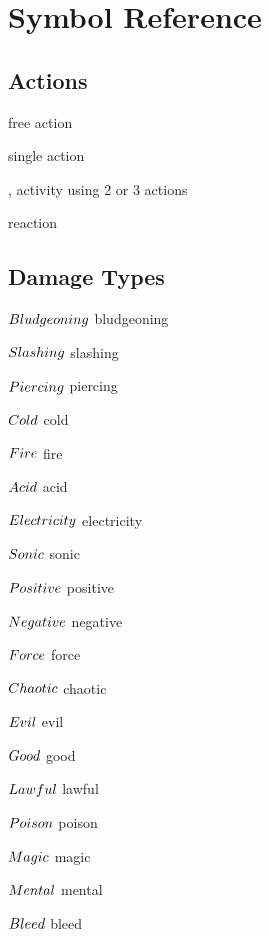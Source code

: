 \documentclass[paper=63mm:88mm, DIV=21, fontsize=7.5pt]{scrartcl}
\begin{document}
\newcommand{\Traits}[1]{\colorbox{tagsBg}{#1}}

\section{Symbol Reference}

\subsection{Actions\hfill{}}

 free action

 single action 

,  activity using 2 or 3 actions

 reaction

\subsection{Damage Types\hfill{}}

\begin{multicols}{3}
\footnotesize

\(\DamageType{Bludgeoning}\) bludgeoning

\(\DamageType{Slashing}\) slashing

\(\DamageType{Piercing}\) piercing

\(\DamageType{Cold}\) cold

\(\DamageType{Fire}\) fire

\(\DamageType{Acid}\) acid

\(\DamageType{Electricity}\) electricity

\(\DamageType{Sonic}\) sonic

\(\DamageType{Positive}\) positive

\(\DamageType{Negative}\) negative

\(\DamageType{Force}\) force

\(\DamageType{Chaotic}\) chaotic

\(\DamageType{Evil}\) evil

\(\DamageType{Good}\) good

\(\DamageType{Lawful}\) lawful

\(\DamageType{Poison}\) poison

\(\DamageType{Magic}\) magic

\(\DamageType{Mental}\) mental

\(\DamageType{Bleed}\) bleed

\end{multicols}
\end{document}
